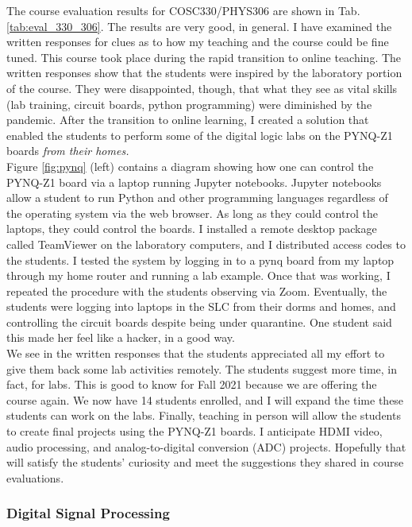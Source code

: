 \documentclass[../../main.tex]{subfiles}
\begin{document}
The course evaluation results for COSC330/PHYS306 are shown in Tab. \ref{tab:eval_330_306}.  The results are very good, in general.  I have examined the written responses for clues as to how my teaching and the course could be fine tuned.  This course took place during the rapid transition to online teaching.  The written responses show that the students were inspired by the laboratory portion of the course.  They were disappointed, though, that what they see as vital skills (lab training, circuit boards, python programming) were diminished by the pandemic.  After the transition to online learning, I created a solution that enabled the students to perform some of the digital logic labs on the PYNQ-Z1 boards \textit{from their homes.}
\\
\vspace{0.15cm}
Figure \ref{fig:pynq} (left) contains a diagram showing how one can control the PYNQ-Z1 board via a laptop running Jupyter notebooks.  Jupyter notebooks allow a student to run Python and other programming languages regardless of the operating system via the web browser.  As long as they could control the laptops, they could control the boards.  I installed a remote desktop package called TeamViewer on the laboratory computers, and I distributed access codes to the students.  I tested the system by logging in to a pynq board from my laptop through my home router and running a lab example.  Once that was working, I repeated the procedure with the students observing via Zoom.  Eventually, the students were logging into laptops in the SLC from their dorms and homes, and controlling the circuit boards despite being under quarantine.  One student said this made her feel like a hacker, in a good way.
\\
\vspace{0.15cm}
We see in the written responses that the students appreciated all my effort to give them back some lab activities remotely.  The students suggest more time, in fact, for labs.  This is good to know for Fall 2021 because we are offering the course again.  We now have 14 students enrolled, and I will expand the time these students can work on the labs.  Finally, teaching in person will allow the students to create final projects using the PYNQ-Z1 boards.  I anticipate HDMI video, audio processing, and analog-to-digital conversion (ADC) projects.  Hopefully that will satisfy the students' curiosity and meet the suggestions they shared in course evaluations.

\subsubsection{Digital Signal Processing}
\end{document}
